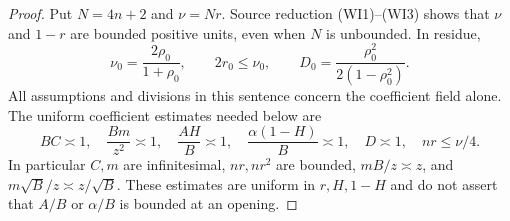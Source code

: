\begin{proof}
Put $N=4n+2$ and $\nu=Nr$. Source reduction (WI1)--(WI3)
shows that $\nu$ and $1-r$ are bounded positive units, even when
$N$ is unbounded. In residue,
\[
 \nu_0=\frac{2\rho_0}{1+\rho_0},\qquad 2r_0\le\nu_0,
 \qquad D_0=\frac{\rho_0^2}{2(1-\rho_0^2)}.             \tag{IC2}
\]
All assumptions and divisions in this sentence concern the coefficient
field alone.
The uniform coefficient estimates needed below are
\[
 BC\asymp1,\quad \frac{Bm}{z^2}\asymp1,\quad
 \frac{AH}B\asymp1,\quad\frac{\alpha(1-H)}B\asymp1,
 \quad D\asymp1,\quad nr\le\nu/4.
\]
In particular $C,m$ are infinitesimal, $nr,nr^2$ are bounded,
$mB/z\asymp z$, and $m\sqrt B/z\asymp z/\sqrt B$.
These estimates are uniform in $r,H,1-H$ and do not assert that
$A/B$ or $\alpha/B$ is bounded at an opening.


\end{proof}
